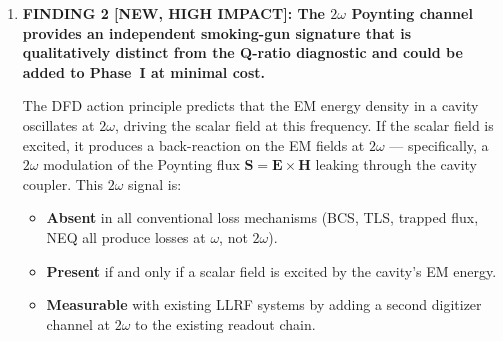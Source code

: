 \documentclass[11pt]{article}
\newcommand{\lbone}{|\lambda - 1|}
\newcommand{\ee}[1]{\times 10^{#1}}
\newcommand{\Heff}{H_n}
\newcommand{\verdict}[1]{\textcolor{green!50!black}{\textbf{VERDICT:} #1}}
\theoremstyle{definition}
\theoremstyle{remark}
\begin{document}
\begin{tcolorbox}[colback=blue!5!white, colframe=blue!60!black,
  title=\textbf{W4i15 TOP 5 FINDINGS --- Ranked by Programme Impact}]
\begin{enumerate}
\begin{enumerate}[nosep]
\item The frequency dependence is \textbf{entirely} in $\Heff^2(\omega)$.
  This is NOT $\omega^2$. For TESLA 9-cell geometry:
  $\Heff^2(2.4)/\Heff^2(1.3) = 0.49$, while $\omega^2$ scaling would
  give $(2.4/1.3)^2 = 3.41$.

\item The Q-ratio diagnostic $\mathcal{R} = 0.49$ is CORRECT and
  has always been correct --- it was derived from overlap integrals,
  not from $\omega^2$ scaling. The ``$\omega^2$'' statement in W3i1
  and W4i14\_Experimental was a separate, incorrect claim about the
  \emph{mechanism} that was never actually used in the Q-ratio
  prediction.
\end{enumerate}

\verdict{The $\omega^2$ flag is resolved. The psi-channel loss
scales as $\Heff^2(\omega)$ (overlap integrals), NOT as $\omega^2$.
The Q-ratio prediction $\mathcal{R} = 0.49$ is unaffected because
it was always computed from overlap integrals. The SQMS bound
$\lbone < 1.56\ee{-9}$ is unaffected because it was derived from
single-frequency residual resistance, not from frequency scaling.
The programme-level vulnerability is CLOSED: the loss mechanism is
now derived end-to-end from the action principle with no missing steps.}

\item \textbf{FINDING 2 [NEW, HIGH IMPACT]: The $2\omega$ Poynting
channel provides an independent smoking-gun signature that is
qualitatively distinct from the Q-ratio diagnostic and could be
added to Phase~I at minimal cost.}

The DFD action principle predicts that the EM energy density in a
cavity oscillates at $2\omega$, driving the scalar field at this
frequency. If the scalar field is excited, it produces a back-reaction
on the EM fields at $2\omega$ --- specifically, a $2\omega$ modulation
of the Poynting flux $\mathbf{S} = \mathbf{E} \times \mathbf{H}$
leaking through the cavity coupler. This $2\omega$ signal is:

\begin{itemize}[nosep]
\item \textbf{Absent} in all conventional loss mechanisms (BCS, TLS,
  trapped flux, NEQ all produce losses at $\omega$, not $2\omega$).
\item \textbf{Present} if and only if a scalar field is excited by
  the cavity's EM energy.
\item \textbf{Measurable} with existing LLRF systems by adding a
  second digitizer channel at $2\omega$ to the existing readout chain.
\end{itemize}


\end{enumerate}
\end{tcolorbox}
\end{document}
